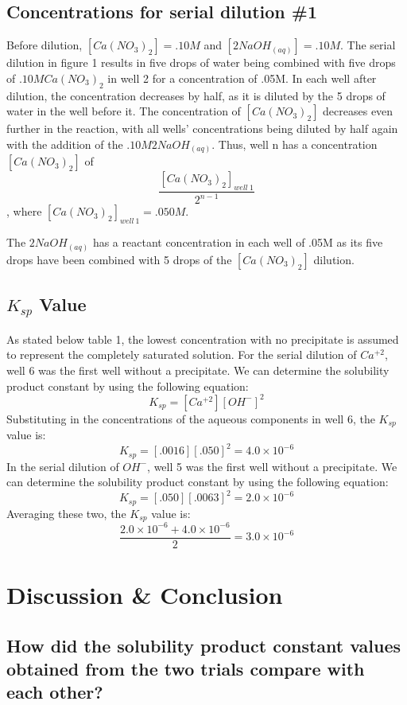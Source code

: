\documentclass{article}
\begin{document}
\subsection{Concentrations for serial dilution \#1}
Before dilution, $[Ca(NO_3)_2] = .10M$ and $[2NaOH_{(aq)}] = .10M$.  The serial dilution in figure 1 results in five drops of water being combined with five drops of $.10M Ca(NO_3)_2$ in well 2 for a concentration of .05M.  In each well after dilution, the concentration decreases by half, as it is diluted by the 5 drops of water in the well before it.  The concentration of $[Ca(NO_3)_2]$ decreases even further in the reaction, with all wells' concentrations being diluted by half again with the addition of the $.10M 2NaOH_{(aq)}$. Thus, well n has a concentration $[Ca(NO_3)_2]$ of 
$$\frac{[Ca(NO_3)_2]_{well\ 1}}{2^{n-1}}$$, where $[Ca(NO_3)_2]_{well\ 1} = .050M$.

The $2NaOH_{(aq)}$ has a reactant concentration in each well of .05M as its five drops have been combined with 5 drops of the $[Ca(NO_3)_2]$ dilution.   

\subsection{$K_{sp}$ Value}
As stated below table 1, the lowest concentration with no precipitate is assumed to represent the completely saturated solution.  For the serial dilution of $Ca^{+2}$, well 6 was the first well without a precipitate.  We can determine the solubility product constant by using the following equation:
$$K_{sp} = [Ca^{+2}][OH^-]^2$$
Substituting in the concentrations of the aqueous components in well 6, the $K_{sp}$ value is:
$$K_{sp} = [.0016][.050]^2 = 4.0\times 10^{-6}$$
In the serial dilution of $OH^{-}$, well 5 was the first well without a precipitate.  We can determine the solubility product constant by using the following equation:
$$K_{sp} = [.050][.0063]^2 = 2.0\times 10^{-6}$$
Averaging these two, the $K_{sp}$ value is:
$$\frac{2.0\times 10^{-6}+4.0\times 10^{-6}}{2} = 3.0\times 10^{-6}$$
\section{Discussion \& Conclusion}
\subsection {How did the solubility product constant values obtained from the two trials compare with each other?}
\end{document}
